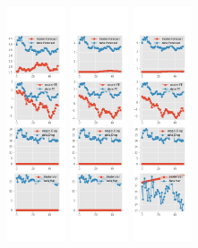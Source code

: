 \documentclass[]{article}
\begin{document}
\begin{figure}[htbp]
\begin{subfigure}[b]{\textwidth}
		\includegraphics[width=0.19\textwidth]{figures/sce_se_est_joint_diag2.png}
		\includegraphics[width=0.19\textwidth]{figures/sce_se_est_joint_diag3.png}
		\includegraphics[width=0.19\textwidth]{figures/sce_se_est_joint_diag4.png}

\end{subfigure}
\end{figure}
\end{document}
